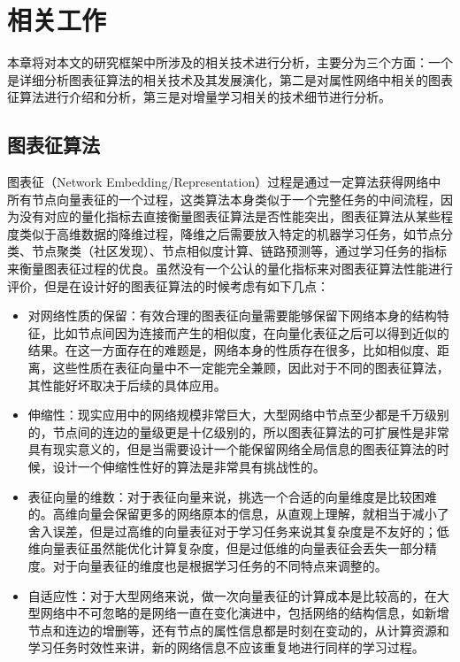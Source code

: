 \chapter{相关工作}
本章将对本文的研究框架中所涉及的相关技术进行分析，主要分为三个方面：一个是详细分析图表征算法的相关技术及其发展演化，第二是对属性网络中相关的图表征算法进行介绍和分析，第三是对增量学习相关的技术细节进行分析。



\section{图表征算法 }
图表征（Network Embedding/Representation）过程是通过一定算法获得网络中所有节点向量表征的一个过程，这类算法本身类似于一个完整任务的中间流程，因为没有对应的量化指标去直接衡量图表征算法是否性能突出，图表征算法从某些程度类似于高维数据的降维过程，降维之后需要放入特定的机器学习任务，如节点分类、节点聚类（社区发现）、节点相似度计算、链路预测等，通过学习任务的指标来衡量图表征过程的优良。虽然没有一个公认的量化指标来对图表征算法性能进行评价\cite{goyal2017graph}，但是在设计好的图表征算法的时候考虑有如下几点：
\begin{itemize}
	\item { 对网络性质的保留：有效合理的图表征向量需要能够保留下网络本身的结构特征，比如节点间因为连接而产生的相似度，在向量化表征之后可以得到近似的结果。在这一方面存在的难题是，网络本身的性质存在很多，比如相似度、距离，这些性质在表征向量中不一定能完全兼顾，因此对于不同的图表征算法，其性能好坏取决于后续的具体应用。}
	\item {伸缩性：现实应用中的网络规模非常巨大，大型网络中节点至少都是千万级别的，节点间的连边的量级更是十亿级别的，所以图表征算法的可扩展性是非常具有现实意义的，但是当需要设计一个能保留网络全局信息的图表征算法的时候，设计一个伸缩性性好的算法是非常具有挑战性的。}
	\item {表征向量的维数：对于表征向量来说，挑选一个合适的向量维度是比较困难的。高维向量会保留更多的网络原本的信息，从直观上理解，就相当于减小了舍入误差，但是过高维的向量表征对于学习任务来说其复杂度是不友好的；低维向量表征虽然能优化计算复杂度，但是过低维的向量表征会丢失一部分精度。对于向量表征的维度也是根据学习任务的不同特点来调整的。}
	\item {自适应性：对于大型网络来说，做一次向量表征的计算成本是比较高的，在大型网络中不可忽略的是网络一直在变化演进中，包括网络的结构信息，如新增节点和连边的增删等，还有节点的属性信息都是时刻在变动的，从计算资源和学习任务时效性来讲，新的网络信息不应该重复地进行同样的学习过程。}
\end{itemize}

